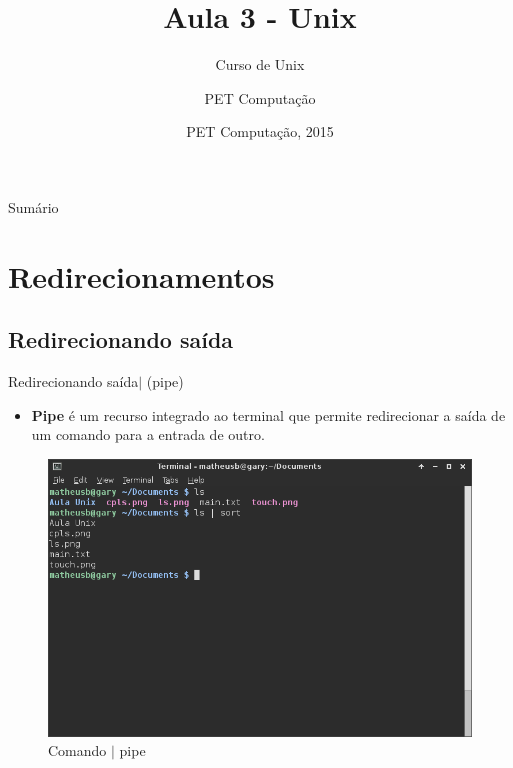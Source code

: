 \documentclass{beamer}
\title{Aula 3 - Unix}
\subtitle{Curso de Unix}
\author{PET Computa\c{c}ão}
\institute[UFSC] %
{
%
  Departamento de Informática e Estatística\\
  Universidade de Santa Catarina}
\date{PET Computa\c{c}ão, 2015}
\begin{document}
\begin{frame}
  \titlepage
\end{frame}

\begin{frame}{Sumário}
  \tableofcontents
\end{frame}

\section{Redirecionamentos}

\subsection{Redirecionando saída}

\begin{frame}{Redirecionando saída}{$|$ (pipe)}
  \begin{itemize}
  \item { \textbf{Pipe} é um recurso integrado ao terminal que permite redirecionar a saída de um comando para  a entrada de outro.
    }\end{itemize}
          \begin{figure}[h!]
        \centering
        \includegraphics[scale=0.30]{pipe.png}
        \caption{Comando $|$ pipe}
        \label{fig:Comando |}
    \end{figure}
\end{frame}
\end{document}
